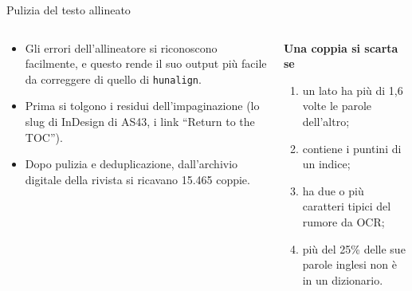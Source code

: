 \documentclass[aspectratio=169]{beamer}
\newcommand{\T}[2]{#2}
\newcommand{\T}[2]{#1}
\begin{document}
\begin{frame}{\T{Cleaning the aligned text}{Pulizia del testo allineato}}
  \begin{columns}[t]
    \begin{column}{0.58\textwidth}
      \small
      \begin{itemize}
        \item \T{The errors of the aligner are easy to spot, which makes its output easier to
              perfect than the one of \texttt{hunalign}.}%
              {Gli errori dell'allineatore si riconoscono facilmente, e questo rende il suo
              output pi\`u facile da correggere di quello di \texttt{hunalign}.}
        \item \T{First the residue of the layout is removed (the InDesign slug of AS43, the
              ``Return to the TOC'' links).}%
              {Prima si tolgono i residui dell'impaginazione (lo slug di InDesign di AS43, i
              link ``Return to the TOC'').}
        \item \T{After cleaning and deduplication, the digital archive of the journal gives
              15{,}465 pairs.}%
              {Dopo pulizia e deduplicazione, dall'archivio digitale della rivista si ricavano 15.465 coppie.}
      \end{itemize}
    \end{column}
    \begin{column}{0.42\textwidth}
      \small
      \textbf{\T{A pair is dropped if}{Una coppia si scarta se}}
      \begin{enumerate}
        \item \T{one side has more than 1.6 times the words of the other;}%
              {un lato ha pi\`u di 1,6 volte le parole dell'altro;}
        \item \T{it contains a table-of-contents leader;}%
              {contiene i puntini di un indice;}
        \item \T{it has two or more characters typical of OCR noise;}%
              {ha due o pi\`u caratteri tipici del rumore da OCR;}
        \item \T{more than 25\% of its English words are not in a dictionary.}%
              {pi\`u del 25\% delle sue parole inglesi non \`e in un dizionario.}
      \end{enumerate}
    \end{column}
  \end{columns}
\end{frame}
\end{document}
